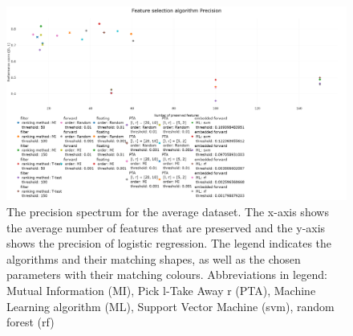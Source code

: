 \documentclass[10pt,a4paper]{article}
\begin{document}
\begin{figure}[H]
	\centering
	\includegraphics[angle=90,height=1.4\textwidth]{Precision_new.png}
	\caption{The precision spectrum for the average dataset. The x-axis shows the average number of features that are preserved and the y-axis shows the precision of logistic regression. The legend indicates the algorithms and their matching shapes, as well as the chosen parameters with their matching colours. Abbreviations in legend: Mutual Information (MI), Pick l-Take Away r (PTA), Machine Learning algorithm (ML), Support Vector Machine (svm), random forest (rf)}
	\label{fig:Avg_Precision_Spectrum}
\end{figure}
\end{document}
